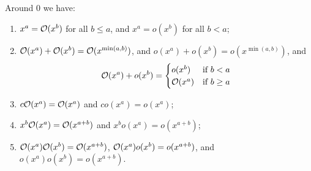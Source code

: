 \begin{node}
\begin{theorem}\label{calculus-0003}%
Around $0$ we have:
\begin{enumerate}
\item $x^{a}=\mathcal{O}(x^{b})$ for all $b\leq a$, and $x^{a}=o(x^{b})$ for
  all $b<a$;
\item $\mathcal{O}(x^{a})+\mathcal{O}(x^{b})=\mathcal{O}(x^{\min(a,b)})$,
  and $o(x^{a})+o(x^{b})=o(x^{\min(a,b)})$, and
\[\mathcal{O}(x^{a})+o(x^{b}) = \begin{cases}o(x^{b}) & \mbox{if }b<a\\
\mathcal{O}(x^{a}) & \mbox{if }b\geq a \end{cases}\]
\item $c\mathcal{O}(x^{a}) = \mathcal{O}(x^{a})$ and $c o(x^{a})=o(x^{a})$;
\item $x^{b}\mathcal{O}(x^{a}) = \mathcal{O}(x^{a+b})$ and
  $x^{b} o(x^{a})=o(x^{a+b})$;
\item $\mathcal{O}(x^{a})\mathcal{O}(x^{b}) = \mathcal{O}(x^{a+b})$,
  $\mathcal{O}(x^{a})o(x^{b}) = o(x^{a+b})$, and
  $o(x^{a})o(x^{b})=o(x^{a+b})$.
\end{enumerate}
\end{theorem}
\end{node}

